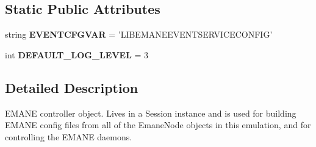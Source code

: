 \subsection*{Static Public Attributes}
\begin{DoxyCompactItemize}
\item 
\hypertarget{classcore_1_1emane_1_1emane_1_1_emane_a162104d2eaa49fba52bf12e01afa0a45}{string {\bfseries E\+V\+E\+N\+T\+C\+F\+G\+V\+A\+R} = 'L\+I\+B\+E\+M\+A\+N\+E\+E\+V\+E\+N\+T\+S\+E\+R\+V\+I\+C\+E\+C\+O\+N\+F\+I\+G'}\label{classcore_1_1emane_1_1emane_1_1_emane_a162104d2eaa49fba52bf12e01afa0a45}

\item 
\hypertarget{classcore_1_1emane_1_1emane_1_1_emane_ac1ac33034ef0e0ecb427775138ce1ae8}{int {\bfseries D\+E\+F\+A\+U\+L\+T\+\_\+\+L\+O\+G\+\_\+\+L\+E\+V\+E\+L} = 3}\label{classcore_1_1emane_1_1emane_1_1_emane_ac1ac33034ef0e0ecb427775138ce1ae8}

\end{DoxyCompactItemize}


\subsection{Detailed Description}
\begin{DoxyVerb}EMANE controller object. Lives in a Session instance and is used for
    building EMANE config files from all of the EmaneNode objects in this
    emulation, and for controlling the EMANE daemons.
\end{DoxyVerb}
 

